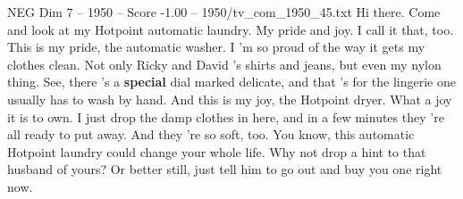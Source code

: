 \begin{textsample}{NEG Dim 7 – 1950 – Score -1.00 – 1950/tv\_com\_1950\_45.txt}  \label{ex:f7_neg_087}
Hi there.
Come and look at my Hotpoint automatic laundry.
My pride and joy.
I call it that, too.
This is my pride, the automatic washer.
I 'm so proud of the way it gets my clothes clean.
Not only Ricky and David 's shirts and jeans, but even my nylon thing.
See, there 's a \textbf{special} dial marked delicate, and that 's for the lingerie one usually has to wash by hand.
And this is my joy, the Hotpoint dryer.
What a joy it is to own.
I just drop the damp clothes in here, and in a few minutes they 're all ready to put away.
And they 're so soft, too.
You know, this automatic Hotpoint laundry could change your whole life.
Why not drop a hint to that husband of yours?
Or better still, just tell him to go out and buy you one right now.

\end{textsample}
